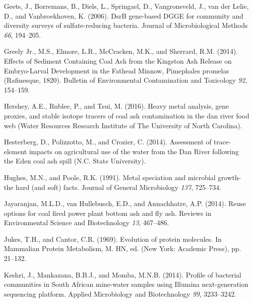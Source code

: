 \documentclass[ms, hidelinks]{uncgdissertationexp}
\theoremstyle{plain}
\theoremstyle{definition}
\theoremstyle{remark}
\begin{document}
\leavevmode\hypertarget{ref-geetsDsrBGenebasedDGGE2006}{}%
Geets, J., Borremans, B., Diels, L., Springael, D., Vangronsveld, J., van der Lelie, D., and Vanbroekhoven, K. (2006). DsrB gene-based DGGE for community and diversity surveys of sulfate-reducing bacteria. Journal of Microbiological Methods \emph{66}, 194--205.

\leavevmode\hypertarget{ref-greelyjr.EffectsSedimentContaining2014}{}%
Greely Jr., M.S., Elmore, L.R., McCracken, M.K., and Sherrard, R.M. (2014). Effects of Sediment Containing Coal Ash from the Kingston Ash Release on Embryo-Larval Development in the Fathead Minnow, Pimephales promelas (Rafinesque, 1820). Bulletin of Environmental Contamination and Toxicology \emph{92}, 154--159.

\leavevmode\hypertarget{ref-hersheyHeavyMetalAnalysis2016}{}%
Hershey, A.E., Rublee, P., and Tsui, M. (2016). Heavy metal analysis, gene proxies, and stable isotope tracers of coal ash contamination in the dan river food web (Water Resources Research Institute of The University of North Carolina).

\leavevmode\hypertarget{ref-hesterbergAssessmentTraceelementImpacts2014}{}%
Hesterberg, D., Polizzotto, M., and Crozier, C. (2014). Assessment of trace-element impacts on agricultural use of the water from the Dan River following the Eden coal ash spill (N.C. State University).

\leavevmode\hypertarget{ref-hughesMetalSpeciationMicrobial1991}{}%
Hughes, M.N., and Poole, R.K. (1991). Metal speciation and microbial growth-the hard (and soft) facts. Journal of General Microbiology \emph{137}, 725--734.

\leavevmode\hypertarget{ref-jayaranjanReuseOptionsCoal2014}{}%
Jayaranjan, M.L.D., van Hullebusch, E.D., and Annachhatre, A.P. (2014). Reuse options for coal fired power plant bottom ash and fly ash. Reviews in Environmental Science and Biotechnology \emph{13}, 467--486.

\leavevmode\hypertarget{ref-jukesEvolutionProteinMolecules1969}{}%
Jukes, T.H., and Cantor, C.R. (1969). Evolution of protein molecules. In Mammalian Protein Metabolism, M. HN, ed. (New York: Academic Press), pp. 21--132.

\leavevmode\hypertarget{ref-keshriProfileBacterialCommunities2014}{}%
Keshri, J., Mankazana, B.B.J., and Momba, M.N.B. (2014). Profile of bacterial communities in South African mine-water samples using Illumina next-generation sequencing platform. Applied Microbiology and Biotechnology \emph{99}, 3233--3242.
\end{document}
